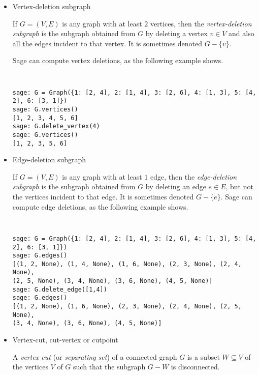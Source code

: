 \begin{itemize}
\item Vertex-deletion subgraph

If $G = (V,E)$ is any graph with at least $2$ vertices, then the
\emph{vertex-deletion subgraph} is the subgraph obtained from $G$ by
deleting a vertex $v \in V$ and also all the edges incident to that
vertex. It is sometimes denoted $G - \{v\}$.

Sage can compute vertex deletions, as the following example shows.
%
\begin{center}
\fontsize{9pt}{9pt}
\selectfont
\tt
\begin{lstlisting}
sage: G = Graph({1: [2, 4], 2: [1, 4], 3: [2, 6], 4: [1, 3], 5: [4, 2], 6: [3, 1]})
sage: G.vertices()
[1, 2, 3, 4, 5, 6]
sage: G.delete_vertex(4)
sage: G.vertices()
[1, 2, 3, 5, 6]
\end{lstlisting}
\end{center}

\item Edge-deletion subgraph

If $G = (V,E)$ is any graph with at least $1$ edge, then the
\emph{edge-deletion subgraph} is the subgraph obtained from $G$ by
deleting an edge $e \in E$, but not the vertices incident to that edge.
It is sometimes denoted $G - \{e\}$. Sage can compute edge deletions,
as the following example shows.
%
\begin{center}
\fontsize{9pt}{9pt}
\selectfont
\tt
\begin{lstlisting}
sage: G = Graph({1: [2, 4], 2: [1, 4], 3: [2, 6], 4: [1, 3], 5: [4, 2], 6: [3, 1]})
sage: G.edges()
[(1, 2, None), (1, 4, None), (1, 6, None), (2, 3, None), (2, 4, None),
(2, 5, None), (3, 4, None), (3, 6, None), (4, 5, None)]
sage: G.delete_edge([1,4])
sage: G.edges()
[(1, 2, None), (1, 6, None), (2, 3, None), (2, 4, None), (2, 5, None),
(3, 4, None), (3, 6, None), (4, 5, None)]
\end{lstlisting}
\end{center}

\item Vertex-cut, cut-vertex or cutpoint

A \emph{vertex cut} (or \emph{separating set}) of a connected graph
$G$ is a subset $W \subseteq V$ of the vertices $V$ of $G$ such that
the subgraph $G - W$ is disconnected.


\end{itemize}
